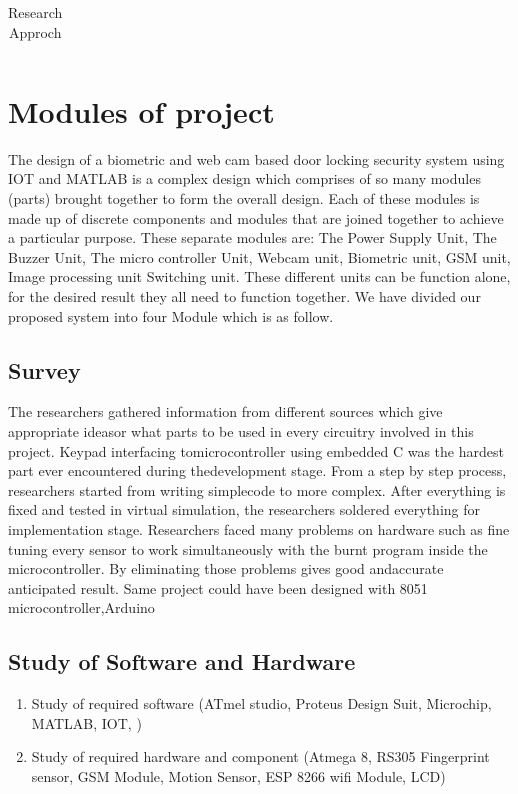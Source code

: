 \documentclass[twoside,a4paper,16pt]{book}
\begin{document}
{{\begin{center}
\begin{table}[h!]
\begin{tabular}{|p{.8cm}|p{3cm}|p{3cm}|p{3cm}|p{4.5cm}|p{1cm}|}
						
						
						\hline
						
					\end{tabular}
					\caption{Research Approch}	
				\end{table}
				
			\end{center}
			\newpage
			\section{Modules of project }
			The design of a biometric and web cam based door locking security system using IOT and MATLAB is a complex design which
			comprises of so many modules (parts) brought together to form the overall design. Each of these modules is
			made up of discrete components and modules that are joined together to achieve a particular purpose. 
			These separate modules are: The Power Supply Unit, The Buzzer Unit, The micro controller Unit, Webcam unit, Biometric unit, GSM unit, Image processing unit
			Switching unit.
			These different units can be function alone, for the desired result they all need to function together. We have divided our proposed system into four Module which is as follow.
			\subsection{Survey}
			The researchers gathered information from different sources which give appropriate ideasor what parts to be used in every circuitry involved in this project. Keypad interfacing tomicrocontroller using embedded C was the hardest part ever encountered during thedevelopment stage. From a step by step process, researchers started from writing simplecode to more complex. After everything is fixed and tested in virtual simulation, the researchers soldered everything for implementation stage. Researchers faced many problems on hardware such as fine tuning every sensor to work simultaneously with the burnt program inside the microcontroller. By eliminating those problems gives good andaccurate anticipated result. Same project could have been designed with 8051 microcontroller,Arduino
			\subsection{Study of Software and Hardware}
			\begin{enumerate}
				\item Study of required software (ATmel studio, Proteus Design Suit, Microchip, MATLAB, IOT, )
				\item Study of required hardware and component (Atmega 8, RS305 Fingerprint sensor, GSM Module, Motion Sensor, ESP 8266 wifi Module, LCD)
			\end{enumerate}
}}
\end{document}
